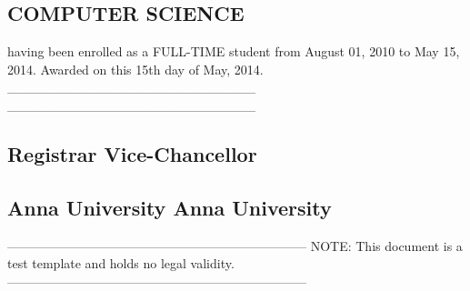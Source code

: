 \subsection*{COMPUTER SCIENCE}

having been enrolled as a FULL-TIME student from August 01, 2010 to May 15, 2014. Awarded on this 15th day of May, 2014. \_\_\_\_\_\_\_\_\_\_\_\_\_\_\_\_\_\_\_\_\_\_\_\_\_\_ \_\_\_\_\_\_\_\_\_\_\_\_\_\_\_\_\_\_\_\_\_\_\_\_\_\_

\subsection*{Registrar Vice-Chancellor}

\subsection*{Anna University Anna University}

----------------------------------------------------------------------- NOTE: This document is a test template and holds no legal validity. -----------------------------------------------------------------------